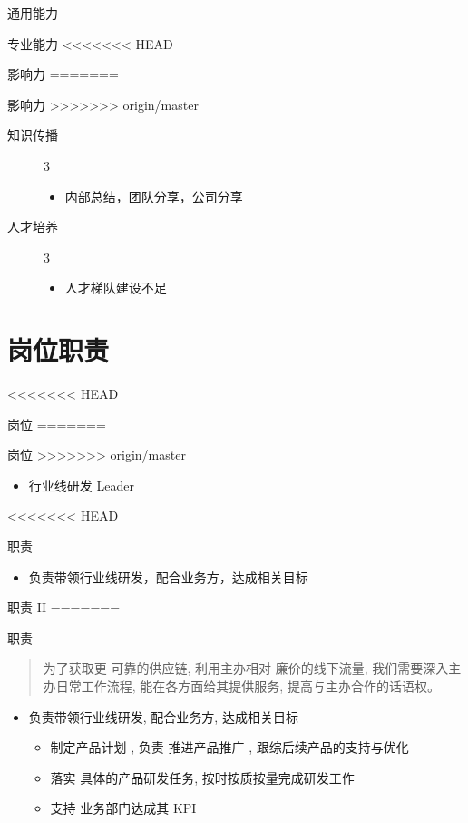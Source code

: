 \documentclass[presentation, bigger]{beamer}
\begin{document}
\begin{frame}[label={sec:org72f7fe4}]{通用能力}
\begin{frame}[label={sec:orgf423d39}]{专业能力}
<<<<<<< HEAD
\begin{frame}[label={sec:org48e65b3}]{影响力}
=======
\begin{frame}[label={sec:org1c1e921}]{影响力}
>>>>>>> origin/master
\begin{description}
\item[{知识传播}] 3
\begin{itemize}
\item 内部总结，团队分享，公司分享
\end{itemize}
\item[{人才培养}] 3
\begin{itemize}
\item 人才梯队建设不足
\end{itemize}
\end{description}
\end{frame}

\section{岗位职责}
<<<<<<< HEAD
\label{sec:orgf8ee7e8}
\begin{frame}[label={sec:org647056e}]{岗位}
=======
\label{sec:org9a7b49e}
\begin{frame}[label={sec:org966d8fb}]{岗位}
>>>>>>> origin/master
\begin{itemize}
\item 行业线研发 Leader
\end{itemize}
\end{frame}
<<<<<<< HEAD
\begin{frame}[label={sec:orgdbf93f1}]{职责}
\begin{itemize}
\item 负责带领行业线研发，配合业务方，达成相关目标
\end{itemize}
\end{frame}
\begin{frame}[label={sec:org0ebd317}]{职责 II}
=======
\begin{frame}[label={sec:orgface95e}]{职责}
\begin{quote}
为了获取更 \alert{可靠的供应链}, 利用主办相对 \alert{廉价的线下流量}, 我们需要深入主办日常工作流程, 能在各方面给其提供服务, 提高与主办合作的话语权。
\end{quote}
\begin{itemize}
\item 负责带领行业线研发, 配合业务方, 达成相关目标
\begin{itemize}
\item \alert{制定产品计划} , 负责 \alert{推进产品推广} , 跟综后续产品的支持与优化
\item \alert{落实} 具体的产品研发任务, 按时按质按量完成研发工作
\item \alert{支持} 业务部门达成其 KPI
\end{itemize}
\end{itemize}
\end{frame}


\end{frame}
\end{frame}
\end{frame}
\end{frame}
\end{frame}
\end{document}
